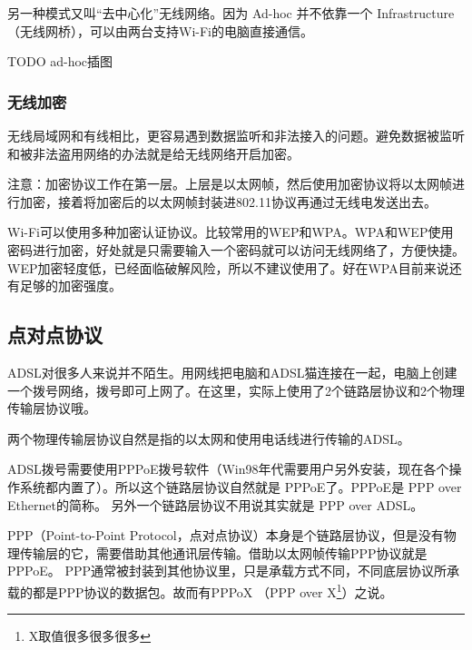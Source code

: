 



另一种模式又叫“去中心化”无线网络。因为 Ad-hoc 并不依靠一个 Infrastructure（无线网桥），可以由两台支持Wi-Fi的电脑直接通信。

TODO ad-hoc插图 %


\subsubsection{无线加密}

无线局域网和有线相比，更容易遇到数据监听和非法接入的问题。避免数据被监听和被非法盗用网络的办法就是给无线网络开启加密。

\begin{notice}
注意：加密协议工作在第一层。上层是以太网帧，然后使用加密协议将以太网帧进行加密，接着将加密后的以太网帧封装进802.11协议再通过无线电发送出去。
\end{notice}

Wi-Fi可以使用多种加密认证协议。比较常用的WEP和WPA。WPA和WEP使用密码进行加密，好处就是只需要输入一个密码就可以访问无线网络了，方便快捷。
WEP加密轻度低，已经面临破解风险，所以不建议使用了。好在WPA目前来说还有足够的加密强度。

\subsection{点对点协议}

ADSL对很多人来说并不陌生。用网线把电脑和ADSL猫连接在一起，电脑上创建一个拨号网络，拨号即可上网了。在这里，实际上使用了2个链路层协议和2个物理传输层协议哦。

两个物理传输层协议自然是指的以太网和使用电话线进行传输的ADSL。

ADSL拨号需要使用PPPoE拨号软件（Win98年代需要用户另外安装，现在各个操作系统都内置了）。所以这个链路层协议自然就是 PPPoE了。PPPoE是 PPP over Ethernet的简称。
另外一个链路层协议不用说其实就是 PPP over ADSL。

PPP（Point-to-Point Protocol，点对点协议）本身是个链路层协议，但是没有物理传输层的它，需要借助其他通讯层传输。借助以太网帧传输PPP协议就是 PPPoE。
PPP通常被封装到其他协议里，只是承载方式不同，不同底层协议所承载的都是PPP协议的数据包。故而有PPPoX （PPP over X\footnote{X取值很多很多很多}）之说。

